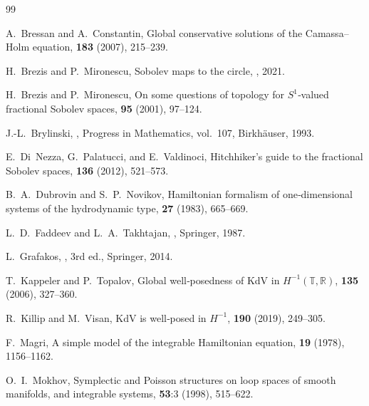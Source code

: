 \documentclass{amsart}
\newcounter{re}
\begin{document}
\begin{thebibliography}{99}

A.~Bressan and A.~Constantin,
\newblock Global conservative solutions of the Camassa–Holm equation,
 {\bf 183} (2007), 215--239.

H.~Brezis and P.~Mironescu,
\newblock Sobolev maps to the circle,
, 2021.

H.~Brezis and P.~Mironescu,
\newblock On some questions of topology for $S^{1}$‑valued fractional Sobolev
  spaces,
  {\bf 95} (2001), 97--124.

J.-L.~Brylinski,
,
\newblock Progress in Mathematics, vol.~107, Birkhäuser, 1993.

E.~Di~Nezza, G.~Palatucci, and E.~Valdinoci,
\newblock Hitchhiker’s guide to the fractional Sobolev spaces,
 {\bf 136} (2012), 521--573.

B.~A.~Dubrovin and S.~P.~Novikov,
\newblock Hamiltonian formalism of one‑dimensional systems of the hydrodynamic
  type,
 {\bf 27} (1983), 665--669.

L.~D.~Faddeev and L.~A.~Takhtajan,
,
\newblock Springer, 1987.

L.~Grafakos,
,
\newblock 3rd ed., Springer, 2014.

T.~Kappeler and P.~Topalov,
\newblock Global well‑posedness of KdV in $H^{-1}(\mathbb T,\mathbb R)$,
 {\bf 135} (2006), 327--360.

R.~Killip and M.~Visan,
\newblock KdV is well‑posed in $H^{-1}$,
 {\bf 190} (2019), 249--305.

F.~Magri,
\newblock A simple model of the integrable Hamiltonian equation,
 {\bf 19} (1978), 1156--1162.

O.~I.~Mokhov,
\newblock Symplectic and Poisson structures on loop spaces of smooth manifolds,
  and integrable systems,
 {\bf 53}:3 (1998), 515--622.


\end{thebibliography}
\end{document}
